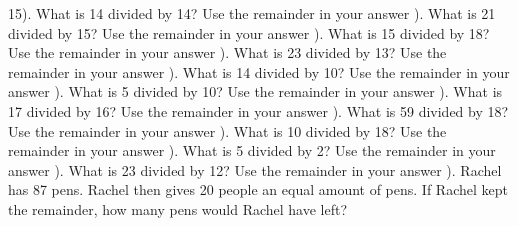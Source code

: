 \documentclass{article}%
\begin{document}
15). What is 14 divided by 14? Use the remainder in your answer%
\newline%
\newline%
). What is 21 divided by 15? Use the remainder in your answer%
\newline%
\newline%
). What is 15 divided by 18? Use the remainder in your answer%
\newline%
\newline%
). What is 23 divided by 13? Use the remainder in your answer%
\newline%
\newline%
). What is 14 divided by 10? Use the remainder in your answer%
\newline%
\newline%
). What is 5 divided by 10? Use the remainder in your answer%
\newline%
\newline%
). What is 17 divided by 16? Use the remainder in your answer%
\newline%
\newline%
). What is 59 divided by 18? Use the remainder in your answer%
\newline%
\newline%
). What is 10 divided by 18? Use the remainder in your answer%
\newline%
\newline%
). What is 5 divided by 2? Use the remainder in your answer%
\newline%
\newline%
). What is 23 divided by 12? Use the remainder in your answer%
\newline%
\newline%
). Rachel has 87 pens. Rachel then gives 20 people an equal amount of pens. If Rachel kept the remainder, how many pens would Rachel have left?%
\newline%
\newline%
\end{document}

